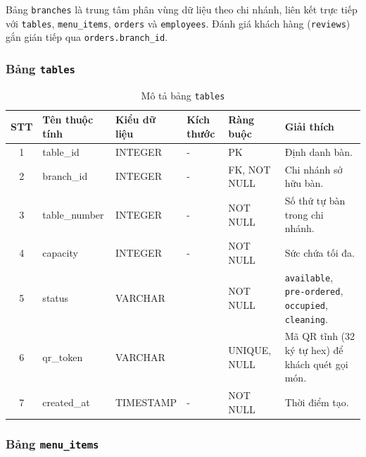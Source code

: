 \documentclass[../DoAn.tex]{subfiles}
\begin{document}
Bảng \texttt{branches} là trung tâm phân vùng dữ liệu theo chi nhánh, liên kết trực tiếp với
\texttt{tables}, \texttt{menu\_items}, \texttt{orders} và \texttt{employees}.
Đánh giá khách hàng (\texttt{reviews}) gắn gián tiếp qua \texttt{orders.branch\_id}.

\subsubsection{Bảng \texttt{tables}}

\begin{table}[H]
\centering
\renewcommand{\arraystretch}{1.3}
\small
\begin{tabularx}{\textwidth}{|c|>{\RaggedRight\arraybackslash}p{2.9cm}|>{\Centering\arraybackslash}p{2.2cm}|>{\Centering\arraybackslash}p{1.3cm}|>{\Centering\arraybackslash}p{2.2cm}|>{\RaggedRight\arraybackslash}X|}
\hline
\textbf{STT} & \textbf{Tên thuộc tính} & \textbf{Kiểu dữ liệu} & \textbf{Kích thước} & \textbf{Ràng buộc} & \textbf{Giải thích} \\
\hline
1 & table\_id & INTEGER & - & PK & Định danh bàn. \\ \hline
2 & branch\_id & INTEGER & - & FK, NOT NULL & Chi nhánh sở hữu bàn. \\ \hline
3 & table\_number & INTEGER & - & NOT NULL & Số thứ tự bàn trong chi nhánh. \\ \hline
4 & capacity & INTEGER & - & NOT NULL & Sức chứa tối đa. \\ \hline
5 & status & VARCHAR & 15 & NOT NULL & \texttt{available}, \texttt{pre-ordered}, \texttt{occupied}, \texttt{cleaning}. \\ \hline
6 & qr\_token & VARCHAR & 32 & UNIQUE, NULL & Mã QR tĩnh (32 ký tự hex) để khách quét gọi món. \\ \hline
7 & created\_at & TIMESTAMP & - & NOT NULL & Thời điểm tạo. \\ \hline
\end{tabularx}
\caption{Mô tả bảng \texttt{tables}}
\end{table}

\subsubsection{Bảng \texttt{menu\_items}}
\end{document}
